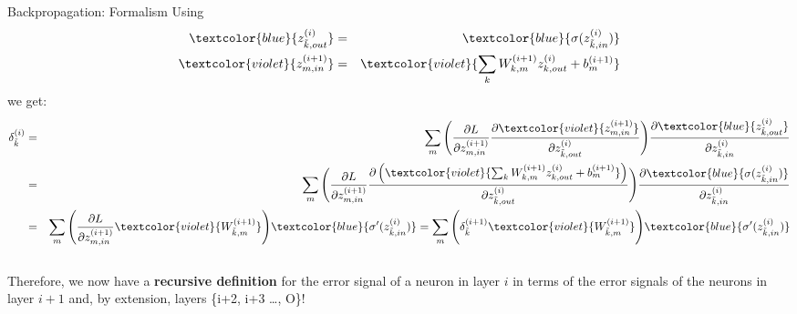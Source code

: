 \begin{frame} {Backpropagation: Formalism}
 Using 
 \vspace*{-5mm}
        {\footnotesize \begin{eqnarray*}
          \textcolor{blue}{z_{\tilde{k},out}^{(i)}} &=& \textcolor{blue}{\sigma(z_{\tilde{k},in}^{(i)})} \\
          \textcolor{violet}{z_{m,in}^{(i+1)}} &=& \textcolor{violet}{\sum_k W_{k,m}^{(i+1)}z_{k,out}^{(i)} + b_m^{(i+1)}}
        \end{eqnarray*}}
we get: 
      \vspace{-0.2cm}
      {\footnotesize \begin{eqnarray*}
      \delta_{\tilde{k}}^{(i)} &=& \sum_m \Bigg( \frac{\partial L}{\partial z_{m,in}^{(i+1)}} \frac{\partial \textcolor{violet}{z_{m,in}^{(i+1)}}}{\partial z_{\tilde{k},out}^{(i)}} \Bigg) \frac{\partial \textcolor{blue}{z_{\tilde{k},out}^{(i)}}}{\partial z_{\tilde{k},in}^{(i)}}  \\
       &=& \sum_m \Bigg( \frac{\partial L}{\partial z_{m,in}^{(i+1)}} \frac{\partial \left(\textcolor{violet}{\sum_k W_{k,m}^{(i+1)}z_{k,out}^{(i)} + b_m^{(i+1)}}\right)}{\partial z_{\tilde{k},out}^{(i)}} \Bigg) \frac{\partial \textcolor{blue}{\sigma(z_{\tilde{k},in}^{(i)})}}{\partial z_{\tilde{k},in}^{(i)}}  \\
      &=& \sum_m \Bigg( \frac{\partial L}{\partial z_{m,in}^{(i+1)}} \textcolor{violet}{W_{\tilde{k},m}^{(i+1)}} \Bigg) \textcolor{blue}{\sigma'(z_{\tilde{k},in}^{(i)})} = \sum_m \Bigg(  \delta_{\tilde{k}}^{(i+1)} \textcolor{violet}{W_{\tilde{k},m}^{(i+1)}} \Bigg) \textcolor{blue}{\sigma'(z_{\tilde{k},in}^{(i)})} 
      \end{eqnarray*}}\\
      Therefore, we now have a \textbf{recursive definition} for the error signal of a neuron in layer $i$ in terms of the error signals of the neurons in layer $i+1$ and, by extension, layers \{i+2, i+3 \ldots , O\}!
\end{frame}

